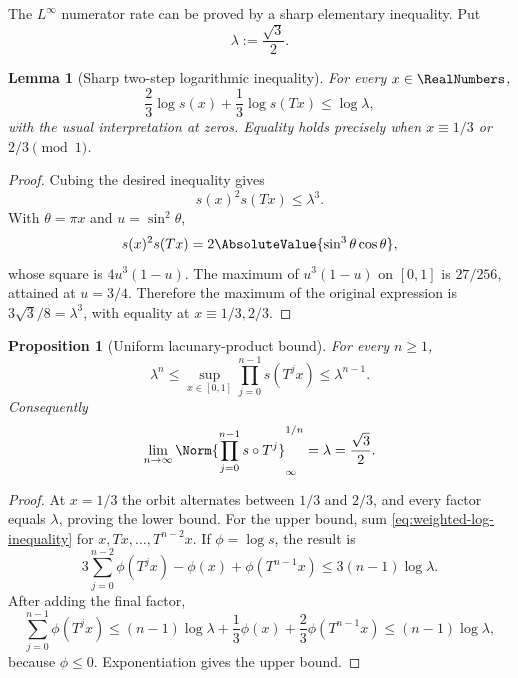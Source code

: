 \documentclass[11pt,oneside]{article}
\newtheorem{proposition}[proposition]{Proposition}
\newtheorem{lemma}[lemma]{Lemma}
\theoremstyle{definition}
\theoremstyle{remark}
\begin{document}
The $L^\infty$ numerator rate can be proved by a sharp elementary inequality.  Put
\begin{equation}
 \lambda:=\frac{\sqrt3}{2}.
 \label{eq:lambda}
\end{equation}

\begin{lemma}[Sharp two-step logarithmic inequality]
\label{lem:sharp-sine-inequality}
For every $x\in\RealNumbers$,
\begin{equation}
 \frac23\log s(x)+\frac13\log s(Tx)\le\log\lambda,
 \label{eq:weighted-log-inequality}
\end{equation}
with the usual interpretation at zeros.  Equality holds precisely when
$x\equiv1/3$ or $2/3\pmod1$.
\end{lemma}

\begin{proof}
Cubing the desired inequality gives
\[
 s(x)^2s(Tx)\le\lambda^3.
\]
With $\theta=\pi x$ and $u=\sin^2\theta$,
\[
 s(x)^2s(Tx)=2\AbsoluteValue{\sin^3\theta\cos\theta},
\]
whose square is $4u^3(1-u)$.  The maximum of $u^3(1-u)$ on $[0,1]$ is $27/256$, attained
at $u=3/4$.  Therefore the maximum of the original expression is
$3\sqrt3/8=\lambda^3$, with equality at $x\equiv1/3,2/3$.
\end{proof}

\begin{proposition}[Uniform lacunary-product bound]
\label{prop:Bn-uniform}
For every $n\ge1$,
\begin{equation}
 \lambda^n\le\sup_{x\in[0,1]}
 \prod_{j=0}^{n-1}s(T^jx)\le\lambda^{n-1}.
 \label{eq:Bn-uniform}
\end{equation}
Consequently
\begin{equation}
 \lim_{n\to\infty}\Norm{\prod_{j=0}^{n-1}s\circ T^j}_{\infty}^{1/n}
 =\lambda=\frac{\sqrt3}{2}.
 \label{eq:Gelfond-rate}
\end{equation}
\end{proposition}

\begin{proof}
At $x=1/3$ the orbit alternates between $1/3$ and $2/3$, and every factor equals
$\lambda$, proving the lower bound.  For the upper bound, sum
\eqref{eq:weighted-log-inequality} for $x,Tx,\dots,T^{n-2}x$.  If
$\phi=\log s$, the result is
\[
 3\sum_{j=0}^{n-2}\phi(T^jx)-\phi(x)+\phi(T^{n-1}x)
 \le3(n-1)\log\lambda.
\]
After adding the final factor,
\[
 \sum_{j=0}^{n-1}\phi(T^jx)
 \le(n-1)\log\lambda+\frac13\phi(x)+\frac23\phi(T^{n-1}x)
 \le(n-1)\log\lambda,
\]
because $\phi\le0$.  Exponentiation gives the upper bound.
\end{proof}
\end{document}

